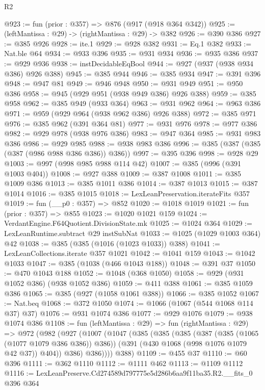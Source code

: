\begin{lexlean}{R2}
\begin{coremodule}
@923 := fun (prior : @357) => @876 (@917 (@918 @364 @342))
@925 := (leftMantissa : @29) -> (rightMantissa : @29) -> @382
@926 := @390 @386
@927 := @385 @926
@928 := ite.{1}
@929 := @928 @382
@931 := Eq.{1} @382
@933 := Nat.ble @64
@934 := @933 @396
@935 := @931 @934
@936 := @935 @386
@937 := @929 @936
@938 := instDecidableEqBool
@944 := @927 (@937 (@938 @934 @386) @926 @388)
@945 := @385 @944
@946 := @385 @934
@947 := @391 @396
@948 := @947 @81
@949 := @946 @948
@950 := @931 @949
@951 := @950 @386
@958 := @945 (@929 @951 (@938 @949 @386) @926 @388)
@959 := @385 @958
@962 := @385 @949 (@933 @364)
@963 := @931 @962
@964 := @963 @386
@971 := @959 (@929 @964 (@938 @962 @386) @926 @388)
@972 := @385 @971
@976 := @385 @962 (@391 @364 @81)
@977 := @931 @976
@978 := @977 @386
@982 := @929 @978 (@938 @976 @386)
@983 := @947 @364
@985 := @931 @983 @386
@986 := @929 @985
@988 := @938 @983 @386
@996 := @385 (@387 (@385 (@387 (@986 @988 @386 @386)) @386))
@997 := @395 @396
@998 := @928 @29
@1003 := @997 (@998 @985 @988 @114 @42)
@1007 := @385 (@996 (@391 @1003 @404))
@1008 := @927 @388
@1009 := @387 @1008
@1011 := @385 @1009 @386
@1013 := @385 @1011 @386
@1014 := @387 @1013
@1015 := @387 @1014
@1016 := @385 @1015
@1018 := LexLeanPreservation.iterateFits @357
@1019 := fun (__p0 : @357) => @852
@1020 := @1018 @1019
@1021 := fun (prior : @357) => @855
@1023 := @1020 @1021 @159
@1024 := VerdantEngine.F64Quotient.DivisionState.mk
@1025 := @1024 @364
@1029 := LexLeanRuntime.subtract @29 instSubNat
@1033 := @1025 (@1029 @1003 @364) @42
@1038 := @385 (@385 (@1016 (@1023 @1033)) @388)
@1041 := LexLeanCollections.iterate @357 @1021
@1042 := @1041 @159
@1043 := @1042 @1033
@1047 := @385 (@1038 (@466 @1043 @188))
@1048 := @391 @37
@1050 := @470 @1043 @188
@1052 := @1048 (@368 @1050)
@1058 := @929 (@931 @1052 @386) (@938 @1052 @386)
@1059 := @411 @388
@1061 := @385 @1059 @386
@1065 := @385 (@927 (@1058 @1061 @388))
@1066 := @385 @1052
@1067 := Nat.beq
@1068 := @372 @1050
@1074 := @1066 (@1067 (@544 @1068 @114 @37) @37)
@1076 := @931 @1074 @386
@1077 := @929 @1076
@1079 := @938 @1074 @386
@1108 := fun (leftMantissa : @29) =>
  fun (rightMantissa : @29) =>
  @972
    (@982
      (@927
        (@1007
          (@1047
            (@385
              (@385
                (@385
                  (@387 (@385 (@1065 (@1077 @1079 @386 @386)) @386))
                  (@391 (@430 @1068 (@998 @1076 @1079 @42 @37)) @404))
                @386)
              @386))))
      @388)
@1109 := @455 @37
@1110 := @60 @396
@1111 := @362 @1110
@1112 := @1111 @462
@1113 := @1109 @1112
@1116 := LexLeanPreserve.Cd274589d797775e5d286b6aa9f11ba35.R2.__fits_0 @396 @364

\end{coremodule}
\end{lexlean}
